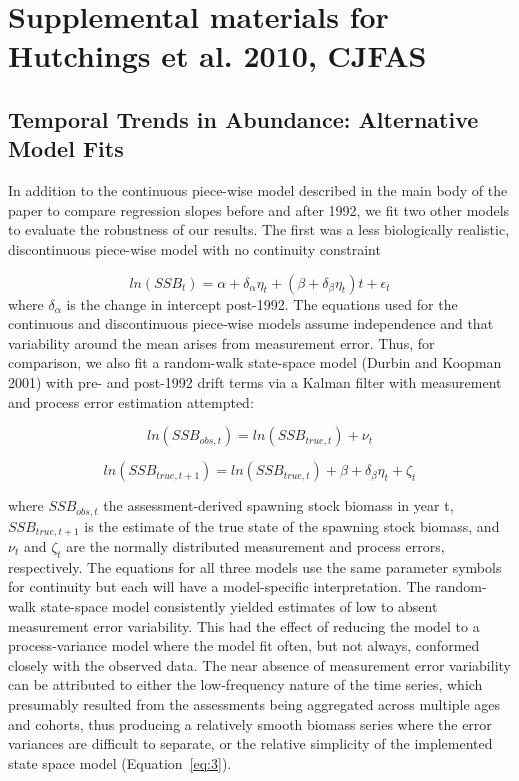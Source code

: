 \documentclass[letterpaper,12pt]{article}
\begin{document}
\section*{Supplemental materials for Hutchings et al. 2010, CJFAS}
\subsection*{Temporal Trends in Abundance: Alternative Model Fits}
In addition to the continuous piece-wise model described in the main
body of the paper to compare regression slopes before and after 1992,
we fit two other models to evaluate the robustness of our results. The
first was a less biologically realistic, discontinuous piece-wise
model with no continuity constraint 

\begin{equation}
ln\left(SSB_{t}\right) = \alpha + \delta_{\alpha}\eta_{t} + \left(\beta + \delta_{\beta}\eta_{t}\right)t + \epsilon_{t}
\end{equation}
where $\delta_{\alpha}$ is the change in intercept post-1992. The equations
used for the continuous and discontinuous piece-wise models assume
independence and that variability around the mean arises from
measurement error. Thus, for comparison, we also fit a random-walk
state-space model (Durbin and Koopman 2001) with pre- and post-1992
drift terms via a Kalman filter with measurement and process error
estimation attempted: 

\begin{equation}
ln\left(SSB_{obs,t}\right) = ln\left(SSB_{true,t}\right) + \nu_{t}
\end{equation}

\begin{equation}
ln\left(SSB_{true,t+1}\right) = ln\left(SSB_{true,t}\right) + \beta + \delta_{\beta}\eta_{t} + \zeta_{t}
\label{eq:3}
\end{equation}

where $SSB_{obs,t}$ the assessment-derived spawning stock biomass in year t, $SSB_{true,t+1}$ is
the estimate of the true state of the spawning stock biomass, and $\nu_{t}$
and $\zeta_{t}$ are the normally distributed measurement and process errors,
respectively. The equations for all three models use the same
parameter symbols for continuity but each will have a model-specific
interpretation. The random-walk state-space model consistently yielded
estimates of low to absent measurement error variability. This had the
effect of reducing the model to a process-variance model where the
model fit often, but not always, conformed closely with the observed
data. The near absence of measurement error variability can be
attributed to either the low-frequency nature of the time series,
which presumably resulted from the assessments being aggregated across
multiple ages and cohorts, thus producing a relatively smooth biomass
series where the error variances are difficult to separate, or the
relative simplicity of the implemented state space model (Equation~\ref{eq:3}).
\end{document}
